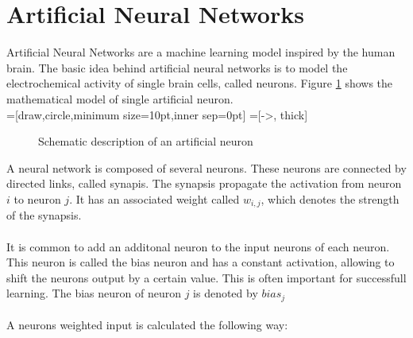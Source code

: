 \section{Artificial Neural Networks}
          
Artificial Neural Networks are a machine learning model inspired by the human brain. The basic idea behind artificial neural networks is to model the electrochemical activity of single brain cells, called neurons. Figure \ref{fig:neuron} shows the mathematical model of single artificial neuron.
\\
=[draw,circle,minimum size=10pt,inner sep=0pt]
=[->, thick]
\begin{figure}[h]
\centering
{}
\caption{Schematic description of an artificial neuron}
\label{fig:neuron}
\end{figure}

A neural network is composed of several neurons. These neurons are connected by directed links, called synapis. The synapsis propagate the activation from neuron $i$ to neuron $j$. It has an associated weight called $w_{i,j}$, which denotes the strength of the synapsis. 
\\
\\
It is common to add an additonal neuron to the input neurons of each neuron. This neuron is called the bias neuron and has a constant activation, allowing to shift the neurons output by a certain value. This is often important for successfull learning. The bias neuron of neuron $j$ is denoted by $bias_j$
\\
\\
A neurons weighted input is calculated the following way:

